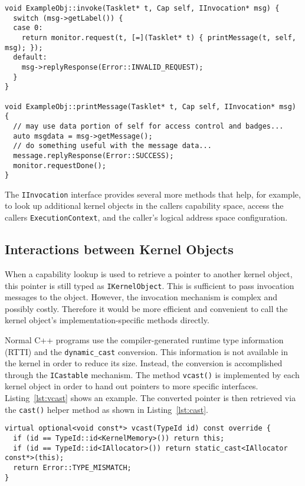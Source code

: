 \begin{lstlisting}[float, label=lst:invokehandler, caption=Example invocation
handler.]
void ExampleObj::invoke(Tasklet* t, Cap self, IInvocation* msg) {
  switch (msg->getLabel()) {
  case 0:
    return monitor.request(t, [=](Tasklet* t) { printMessage(t, self, msg); });
  default:
    msg->replyResponse(Error::INVALID_REQUEST);
  }
}

void ExampleObj::printMessage(Tasklet* t, Cap self, IInvocation* msg) {
  // may use data portion of self for access control and badges...
  auto msgdata = msg->getMessage();
  // do something useful with the message data...
  message.replyResponse(Error::SUCCESS);
  monitor.requestDone();
}
\end{lstlisting}

The \texttt{IInvocation} interface provides several more methods that
help, for example, to look up additional kernel objects in the callers
capability space, access the callers \texttt{ExecutionContext}, and
the caller's logical address space configuration.

\subsection{Interactions between Kernel Objects}

When a capability lookup is used to retrieve a pointer to another
kernel object, this pointer is still typed as
\texttt{IKernelObject}. This is sufficient to pass invocation messages
to the object. However, the invocation mechanism is complex and
possibly costly. Therefore it would be more efficient and convenient
to call the kernel object's implementation-specific methods
directly.

Normal C++ programs use the compiler-generated runtime type
information (RTTI) and the \texttt{dynamic\_cast} conversion. This
information is not available in the kernel in order to reduce its
size. Instead, the conversion is accomplished through the
\texttt{ICastable} mechanism. The method \texttt{vcast()} is
implemented by each kernel object in order to hand out pointers to
more specific interfaces. Listing~\ref{lst:vcast} shows an example.
The converted pointer is then retrieved via the \texttt{cast()} helper
method as shown in Listing~\ref{lst:cast}.

\begin{lstlisting}[float, label=lst:vcast, caption=Example run-time type conversion in the \texttt{KernelMemory} object.]
virtual optional<void const*> vcast(TypeId id) const override {
  if (id == TypeId::id<KernelMemory>()) return this;
  if (id == TypeId::id<IAllocator>()) return static_cast<IAllocator const*>(this);
  return Error::TYPE_MISMATCH;
}
\end{lstlisting}

